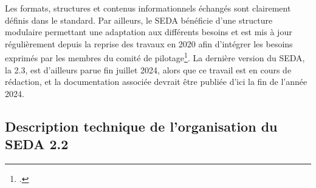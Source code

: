 Les formats, structures et contenus informationnels échangés sont clairement définis dans le standard. Par ailleurs, le \gls{SEDA} bénéficie d'une structure modulaire permettant une adaptation aux différents besoins et est mis à jour régulièrement depuis la reprise des travaux en 2020 afin d’intégrer les besoins exprimés par les membres du comité de pilotage\footcite{noauthor_standard_2024}. La dernière version du \gls{SEDA}, la 2.3, est d’ailleurs parue fin juillet 2024, alors que ce travail est en cours de rédaction, et la documentation associée devrait être publiée d’ici la fin de l’année 2024. 

\subsection{Description technique de l’organisation du SEDA 2.2}


